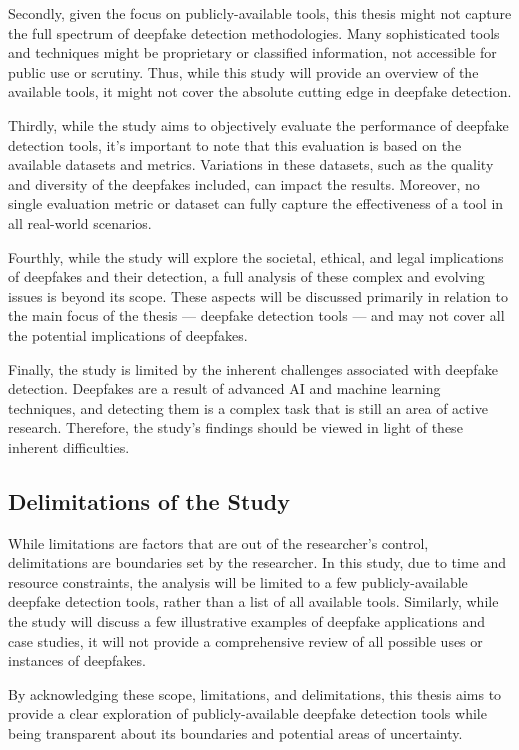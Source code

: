 Secondly, given the focus on publicly-available tools, this thesis might not capture
the full spectrum of deepfake detection methodologies. Many sophisticated tools and
techniques might be proprietary or classified information, not accessible for public
use or scrutiny. Thus, while this study will provide an overview of the
available tools, it might not cover the absolute cutting edge in deepfake detection.

Thirdly, while the study aims to objectively evaluate the performance of deepfake
detection tools, it's important to note that this evaluation is based on the
available datasets and metrics. Variations in these datasets, such as the quality
and diversity of the deepfakes included, can impact the results. Moreover, no
single evaluation metric or dataset can fully capture the effectiveness of a tool
in all real-world scenarios.

Fourthly, while the study will explore the societal, ethical, and legal implications
of deepfakes and their detection, a full analysis of these complex and
evolving issues is beyond its scope. These aspects will be discussed primarily in
relation to the main focus of the thesis --- deepfake detection tools --- and may not
cover all the potential implications of deepfakes.

Finally, the study is limited by the inherent challenges associated with deepfake
detection. Deepfakes are a result of advanced \ac{AI} and machine learning techniques,
and detecting them is a complex task that is still an area of active research.
Therefore, the study's findings should be viewed in light of these inherent difficulties.

\subsection{Delimitations of the Study}
While limitations are factors that are out of the researcher's control, delimitations
are boundaries set by the researcher. In this study, due to time and resource constraints,
the analysis will be limited to a few publicly-available deepfake detection tools,
rather than a list of all available tools. Similarly, while the study will discuss
a few illustrative examples of deepfake applications and case
studies, it will not provide a comprehensive review of all possible uses or instances
of deepfakes.

By acknowledging these scope, limitations, and delimitations, this thesis aims to
provide a clear exploration of publicly-available deepfake detection tools while
being transparent about its boundaries and potential areas of uncertainty.

